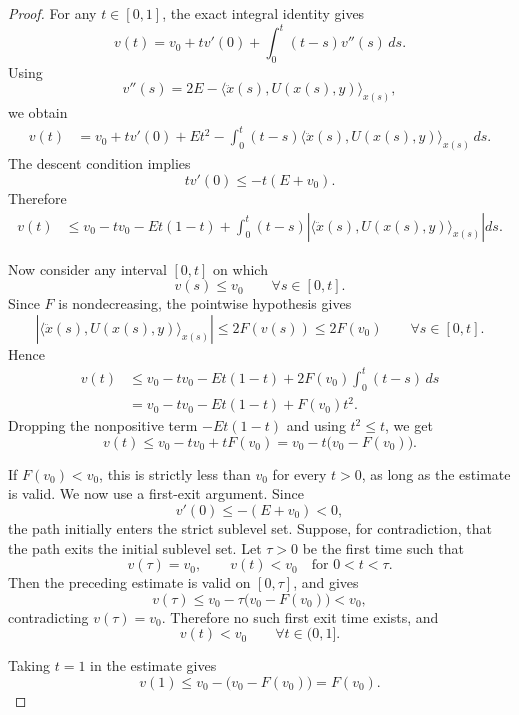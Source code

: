 \documentclass[11pt]{article}
\begin{document}
\begin{proof}
For any \(t\in[0,1]\), the exact integral identity gives
\[
    v(t)
    =
    v_0+t v'(0)+\int_0^t(t-s)v''(s)\,ds.
\]
Using
\[
    v''(s)
    =
    2E-\langle \ddot x(s),U(x(s),y)\rangle_{x(s)},
\]
we obtain
\[
\begin{aligned}
    v(t)
    &=
    v_0+t v'(0)+Et^2
    -
    \int_0^t(t-s)
    \langle \ddot x(s),U(x(s),y)\rangle_{x(s)}\,ds.
\end{aligned}
\]
The descent condition implies
\[
    t v'(0)\le -t(E+v_0).
\]
Therefore
\[
\begin{aligned}
    v(t)
    &\le
    v_0-tv_0-Et(1-t)
    +
    \int_0^t(t-s)
    \left|
    \langle \ddot x(s),U(x(s),y)\rangle_{x(s)}
    \right|ds.
\end{aligned}
\]

Now consider any interval \([0,t]\) on which
\[
    v(s)\le v_0
    \qquad
    \forall s\in[0,t].
\]
Since \(F\) is nondecreasing, the pointwise hypothesis gives
\[
    \left|
    \langle \ddot x(s),U(x(s),y)\rangle_{x(s)}
    \right|
    \le
    2F(v(s))
    \le
    2F(v_0)
    \qquad
    \forall s\in[0,t].
\]
Hence
\[
\begin{aligned}
    v(t)
    &\le
    v_0-tv_0-Et(1-t)
    +
    2F(v_0)\int_0^t(t-s)\,ds  \\
    &=
    v_0-tv_0-Et(1-t)
    +
    F(v_0)t^2.
\end{aligned}
\]
Dropping the nonpositive term \(-Et(1-t)\) and using \(t^2\le t\), we get
\[
    v(t)
    \le
    v_0-tv_0+tF(v_0)
    =
    v_0-t\bigl(v_0-F(v_0)\bigr).
\]

If \(F(v_0)<v_0\), this is strictly less than \(v_0\) for every \(t>0\),
as long as the estimate is valid. We now use a first-exit argument. Since
\[
    v'(0)\le -(E+v_0)<0,
\]
the path initially enters the strict sublevel set. Suppose, for contradiction,
that the path exits the initial sublevel set. Let \(\tau>0\) be the first time
such that
\[
    v(\tau)=v_0,
    \qquad
    v(t)<v_0
    \quad
    \text{for }0<t<\tau.
\]
Then the preceding estimate is valid on \([0,\tau]\), and gives
\[
    v(\tau)
    \le
    v_0-\tau\bigl(v_0-F(v_0)\bigr)
    <
    v_0,
\]
contradicting \(v(\tau)=v_0\). Therefore no such first exit time exists, and
\[
    v(t)<v_0
    \qquad
    \forall t\in(0,1].
\]

Taking \(t=1\) in the estimate gives
\[
    v(1)
    \le
    v_0-\bigl(v_0-F(v_0)\bigr)
    =
    F(v_0).
\]
\end{proof}
\end{document}
